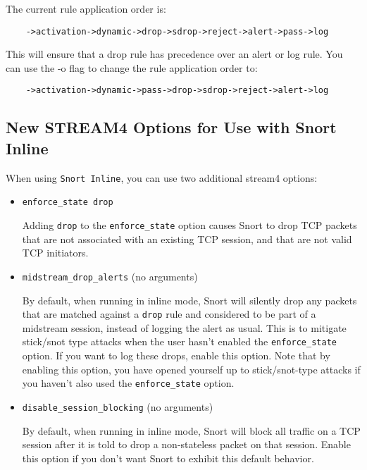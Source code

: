 \documentclass[english]{report}
\begin{document}
The current rule application order is: 
\begin{verbatim}
	->activation->dynamic->drop->sdrop->reject->alert->pass->log
\end{verbatim}
This will ensure that a drop rule has precedence over an alert or log rule.
You can use the -o flag to change the rule application order to:
\begin{verbatim}
	->activation->dynamic->pass->drop->sdrop->reject->alert->log
\end{verbatim}

\subsection{New STREAM4 Options for Use with Snort Inline\label{Stream4Inline}}

When using \texttt{Snort Inline}, you can use two additional stream4 options:

\begin{itemize}
\item \texttt{enforce\_state drop}
   
   Adding \texttt{drop} to the \texttt{enforce\_state} option causes Snort to
    drop TCP packets that are not associated with an existing TCP session, and
    that are not valid TCP initiators.

\item \texttt{midstream\_drop\_alerts} (no arguments)
   
   By default, when running in inline mode, Snort will silently drop any
    packets that are matched against a \texttt{drop} rule and considered
    to be part of a midstream session, instead of logging the alert as usual.
    This is to mitigate stick/snot type attacks when the user
    hasn't enabled the \texttt{enforce\_state} option.  If you want to log
    these drops, enable this option. Note
    that by enabling this option, you have opened yourself up to
    stick/snot-type attacks if you haven't also used the
    \texttt{enforce\_state} option.

\item \texttt{disable\_session\_blocking} (no arguments)

   By default, when running in inline mode, Snort will block all traffic
    on a TCP session after it is told to drop a non-stateless packet on
    that session. Enable this option if you don't want Snort to exhibit
    this default behavior.

\end{itemize}
\end{document}
